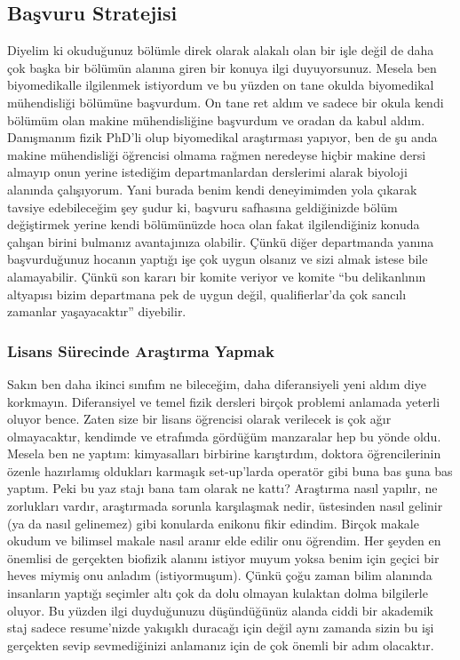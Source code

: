 \documentclass[12pt]{article}
\theoremstyle{break}
\begin{document}
\subsection{Başvuru Stratejisi}
Diyelim ki okuduğunuz bölümle direk olarak alakalı olan bir işle değil de daha çok başka bir bölümün alanına giren bir konuya ilgi duyuyorsunuz. Mesela ben biyomedikalle ilgilenmek istiyordum ve bu yüzden on tane okulda biyomedikal mühendisliği bölümüne başvurdum. On tane ret aldım ve sadece bir okula kendi bölümüm olan makine mühendisliğine başvurdum ve oradan da kabul aldım. Danışmanım fizik PhD’li olup biyomedikal araştırması yapıyor, ben de şu anda makine mühendisliği öğrencisi olmama rağmen neredeyse hiçbir makine dersi almayıp onun yerine istediğim departmanlardan derslerimi alarak biyoloji alanında çalışıyorum. Yani burada benim kendi deneyimimden yola çıkarak tavsiye edebileceğim şey şudur ki, başvuru safhasına geldiğinizde bölüm değiştirmek yerine kendi bölümünüzde hoca olan fakat ilgilendiğiniz konuda çalışan birini bulmanız avantajınıza olabilir. Çünkü diğer departmanda yanına başvurduğunuz hocanın yaptığı işe çok uygun olsanız ve sizi almak istese bile alamayabilir. Çünkü son kararı bir komite veriyor ve komite ``bu delikanlının altyapısı bizim departmana pek de uygun değil, qualifierlar’da çok sancılı zamanlar yaşayacaktır'' diyebilir.

\subsubsection{Lisans Sürecinde Araştırma Yapmak}
Sakın ben daha ikinci sınıfım ne bileceğim, daha diferansiyeli yeni aldım diye korkmayın. Diferansiyel ve temel fizik dersleri birçok problemi anlamada yeterli oluyor bence. Zaten size bir lisans öğrencisi olarak verilecek is çok ağır olmayacaktır, kendimde ve etrafımda gördüğüm manzaralar hep bu yönde oldu. Mesela ben ne yaptım: kimyasalları birbirine karıştırdım, doktora öğrencilerinin özenle hazırlamış oldukları karmaşık set-up’larda operatör gibi buna bas şuna bas yaptım. Peki bu yaz stajı bana tam olarak ne kattı? Araştırma nasıl yapılır, ne zorlukları vardır, araştırmada sorunla karşılaşmak nedir, üstesinden nasıl gelinir (ya da nasıl gelinemez) gibi konularda enikonu fikir edindim. Birçok makale okudum ve bilimsel makale nasıl aranır elde edilir onu öğrendim. Her şeyden en önemlisi de gerçekten biofizik alanını istiyor muyum yoksa benim için geçici bir heves miymiş onu anladım (istiyormuşum). Çünkü çoğu zaman bilim alanında insanların yaptığı seçimler altı çok da dolu olmayan kulaktan dolma bilgilerle oluyor. Bu yüzden ilgi duyduğunuzu düşündüğünüz alanda ciddi bir akademik staj sadece resume’nizde yakışıklı duracağı için değil aynı zamanda sizin bu işi gerçekten sevip sevmediğinizi anlamanız için de çok önemli bir adım olacaktır.
\end{document}
